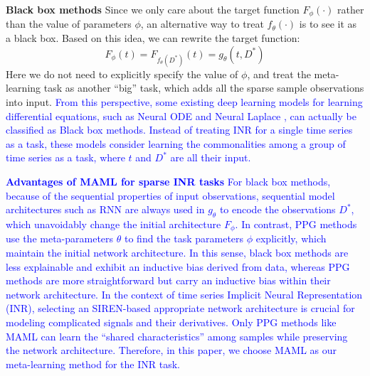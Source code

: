 \documentclass{article}
\begin{document}
\textbf{Black box methods}
Since we only care about the target function $F_\phi(\cdot)$ rather than the value of parameters $\phi$, an alternative way to treat $f_\theta(\cdot)$ is to see it as a black box. Based on this idea, we can rewrite the target function:
$$
F_\phi(t)=F_{f_\theta(D^*)}(t)=g_\theta(t,D^*)
$$
Here we do not need to explicitly specify the value of $\phi$, and treat the meta-learning task as another ``big'' task, which adds all the sparse sample observations into input.
\textcolor{blue}{
  From this perspective, some existing deep learning models for learning differential equations, 
  such as Neural ODE \cite{chen2018neural} and Neural Laplace \cite{holt2022neural}, 
  can actually be classified as Black box methods. 
  Instead of treating INR for a single time series as a task, 
  these models consider learning the commonalities among a group of time series as a task, where $t$ and $D^*$ are all their input.
}

\textcolor{blue}{
\textbf{Advantages of MAML for sparse INR tasks}
For black box methods, because of the sequential properties of input observations, sequential model architectures such as RNN are always used in $g_\theta$ to encode the observations $D^*$, which unavoidably change the initial architecture $F_\phi$.
In contrast, PPG methods use the meta-parameters $\theta$ to find the task parameters $\phi$ explicitly, which maintain the initial network architecture.
In this sense, black box methods are less explainable and exhibit an inductive bias derived from data, 
whereas PPG methods are more straightforward but carry an inductive bias within their network architecture.
In the context of time series Implicit Neural Representation (INR), selecting an SIREN-based appropriate network architecture is crucial for modeling complicated signals and their derivatives.
Only PPG methods like MAML can learn the ``shared characteristics'' among samples while preserving the network architecture.
Therefore, in this paper, we choose MAML as our meta-learning method for the INR task.
}
\end{document}
